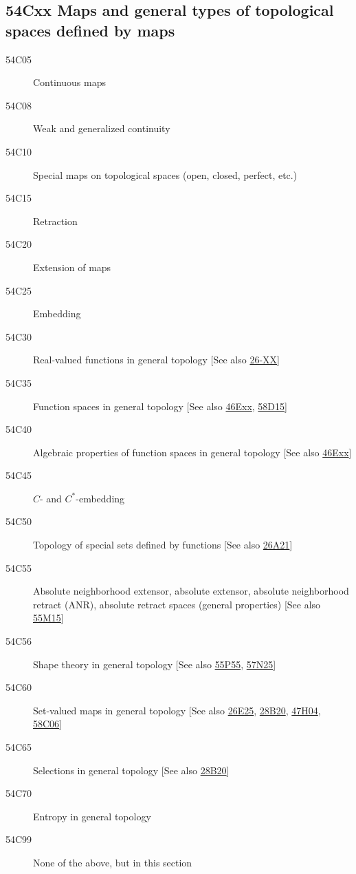 \documentclass[letterpaper]{article}
\begin{document}
\subsection*{54Cxx  Maps and general types of topological spaces defined by maps }\label{54Cxx}
\begin{description}  
\item [54C05]\label{54C05} Continuous maps
\item [54C08]\label{54C08} Weak and generalized continuity
\item [54C10]\label{54C10} Special maps on topological spaces (open, closed, perfect, etc.)
\item [54C15]\label{54C15} Retraction
\item [54C20]\label{54C20} Extension of maps
\item [54C25]\label{54C25} Embedding
\item [54C30]\label{54C30} Real-valued functions in general topology [See also \hyperref[26-XX]{26-XX}]
\item [54C35]\label{54C35} Function spaces in general topology [See also \hyperref[46Exx]{46Exx}, \hyperref[58D15]{58D15}]
\item [54C40]\label{54C40} Algebraic properties of function spaces in general topology [See also \hyperref[46Exx]{46Exx}]
\item [54C45]\label{54C45} $C$- and $C^*$-embedding
\item [54C50]\label{54C50} Topology of special sets defined by functions [See also \hyperref[26A21]{26A21}]
\item [54C55]\label{54C55} Absolute neighborhood extensor, absolute extensor, absolute neighborhood retract (ANR), absolute retract spaces (general properties) [See also \hyperref[55M15]{55M15}]
\item [54C56]\label{54C56} Shape theory in general topology [See also \hyperref[55P55]{55P55}, \hyperref[57N25]{57N25}]
\item [54C60]\label{54C60} Set-valued maps in general topology [See also \hyperref[26E25]{26E25}, \hyperref[28B20]{28B20}, \hyperref[47H04]{47H04}, \hyperref[58C06]{58C06}]
\item [54C65]\label{54C65} Selections in general topology [See also \hyperref[28B20]{28B20}]
\item [54C70]\label{54C70} Entropy in general topology
\item [54C99]\label{54C99} None of the above, but in this section
\end{description}
\end{document}
